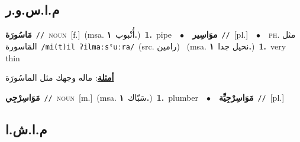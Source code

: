 \documentclass[10pt,a4paper,twoside]{article} %
\begin{document}
\begin{multicols}{2}
\vspace{-3mm}
\subsection*{\color{blue}\foreignlanguage{arabic}{م.ا.س.و.ر}\color{blue}{ (ntws)}} 

{\setlength\topsep{0pt}\textbf{\foreignlanguage{arabic}{مَاسُورَة}}\ {\color{gray}\texttt{//}\color{black}}\ \textsc{noun}\ [f.]\ \color{gray}(msa. \foreignlanguage{arabic}{أُنْبوب}~\foreignlanguage{arabic}{\textbf{١.}})\color{black}\ \textbf{1.}~pipe\ \ $\bullet$\ \ \setlength\topsep{0pt}\textbf{\foreignlanguage{arabic}{موَاسِير}}\ {\color{gray}\texttt{//}\color{black}}\ [pl.]\ \ $\bullet$\ \ \textsc{ph.} \color{gray} \foreignlanguage{arabic}{مثل المَاسورة}\color{black}\ {\color{gray}\texttt{/{\sffamily mi(t)il ʔilmaːsˤuːra}/}\color{black}}\ \color{gray}(src. \foreignlanguage{arabic}{رامين})\color{black}\ \color{gray} (msa. \foreignlanguage{arabic}{نحيل جدا}~\foreignlanguage{arabic}{\textbf{١.}})\color{black}\ \textbf{1.}~very thin\  \begin{flushright}\color{gray}\foreignlanguage{arabic}{\textbf{\underline{\foreignlanguage{arabic}{أمثلة}}}: ماله وجهك مثل الماسُورَة}\end{flushright}\color{black}} \vspace{2mm}

{\setlength\topsep{0pt}\textbf{\foreignlanguage{arabic}{مَوَاسِرْجِي}}\ {\color{gray}\texttt{//}\color{black}}\ \textsc{noun}\ [m.]\ \color{gray}(msa. \foreignlanguage{arabic}{سَبّاك}~\foreignlanguage{arabic}{\textbf{١.}})\color{black}\ \textbf{1.}~plumber\ \ $\bullet$\ \ \setlength\topsep{0pt}\textbf{\foreignlanguage{arabic}{مَوَاسِرْجِيِّة}}\ {\color{gray}\texttt{//}\color{black}}\ [pl.]\ 

\vspace{-3mm}
\subsection*{\color{blue}\foreignlanguage{arabic}{م.ا.ش.ا}\color{blue}{ (ntws)}} 

}
\end{multicols}
\end{document}
